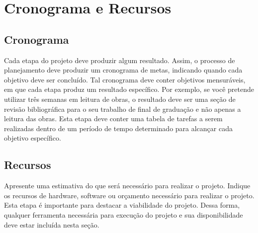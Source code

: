\chapter{Cronograma e Recursos}
 \section{Cronograma}

Cada etapa do projeto deve produzir algum resultado. Assim, o processo de planejamento deve produzir um cronograma de metas, indicando quando cada objetivo deve ser concluído. Tal cronograma deve conter objetivos mensuráveis, em que cada etapa produz um resultado específico. Por exemplo, se você pretende utilizar três semanas em leitura de obras, o resultado deve ser uma seção de revisão bibliográfica para o seu trabalho de final de graduação e não apenas a leitura das obras.  
Esta etapa deve conter uma tabela de tarefas a serem realizadas dentro de um período de tempo determinado para alcançar cada objetivo específico.

\section{Recursos} 

Apresente uma estimativa do que será necessário para realizar o projeto. Indique os recursos de hardware, software ou orçamento necessário para realizar o projeto. Esta etapa é importante para destacar a viabilidade do projeto. Dessa forma, qualquer ferramenta necessária para execução do projeto e sua disponibilidade deve estar incluída nesta seção. 
